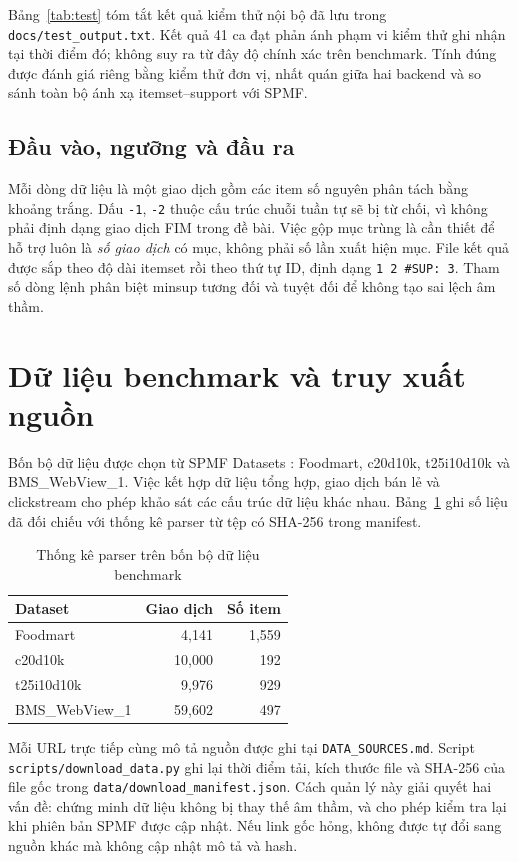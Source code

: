 \documentclass[conference,10pt]{IEEEtran}
\newcommand{\myitem}[1]{\texttt{#1}}
\begin{document}
Bảng~\ref{tab:test} tóm tắt kết quả kiểm thử nội bộ đã lưu trong \myitem{docs/test\_output.txt}. Kết quả 41 ca đạt phản ánh phạm vi kiểm thử ghi nhận tại thời điểm đó; không suy ra từ đây độ chính xác trên benchmark. Tính đúng được đánh giá riêng bằng kiểm thử đơn vị, nhất quán giữa hai backend và so sánh toàn bộ ánh xạ itemset--support với SPMF.

\subsection{Đầu vào, ngưỡng và đầu ra}
Mỗi dòng dữ liệu là một giao dịch gồm các item số nguyên phân tách bằng khoảng trắng. Dấu \myitem{-1}, \myitem{-2} thuộc cấu trúc chuỗi tuần tự sẽ bị từ chối, vì không phải định dạng giao dịch FIM trong đề bài. Việc gộp mục trùng là cần thiết để hỗ trợ luôn là \emph{số giao dịch} có mục, không phải số lần xuất hiện mục. File kết quả được sắp theo độ dài itemset rồi theo thứ tự ID, định dạng \myitem{1 2 \#SUP: 3}. Tham số dòng lệnh phân biệt minsup tương đối và tuyệt đối để không tạo sai lệch âm thầm.

\section{Dữ liệu benchmark và truy xuất nguồn}
Bốn bộ dữ liệu được chọn từ SPMF Datasets \cite{spmfdata}: Foodmart, c20d10k, t25i10d10k và BMS\_WebView\_1. Việc kết hợp dữ liệu tổng hợp, giao dịch bán lẻ và clickstream cho phép khảo sát các cấu trúc dữ liệu khác nhau. Bảng~\ref{tab:datasets} ghi số liệu đã đối chiếu với thống kê parser từ tệp có SHA-256 trong manifest.

\begin{table}[t]
\centering\caption{Thống kê parser trên bốn bộ dữ liệu benchmark}\label{tab:datasets}
\begin{tabular}{@{}lrr@{}}\toprule
Dataset & Giao dịch & Số item\\\midrule
Foodmart & 4,141 & 1,559\\
c20d10k & 10,000 & 192\\
t25i10d10k & 9,976 & 929\\
BMS\_WebView\_1 & 59,602 & 497\\\bottomrule
\end{tabular}
\end{table}

Mỗi URL trực tiếp cùng mô tả nguồn được ghi tại \myitem{DATA\_SOURCES.md}. Script \myitem{scripts/download\_data.py} ghi lại thời điểm tải, kích thước file và SHA-256 của file gốc trong \myitem{data/download\_manifest.json}. Cách quản lý này giải quyết hai vấn đề: chứng minh dữ liệu không bị thay thế âm thầm, và cho phép kiểm tra lại khi phiên bản SPMF được cập nhật. Nếu link gốc hỏng, không được tự đổi sang nguồn khác mà không cập nhật mô tả và hash.
\end{document}
